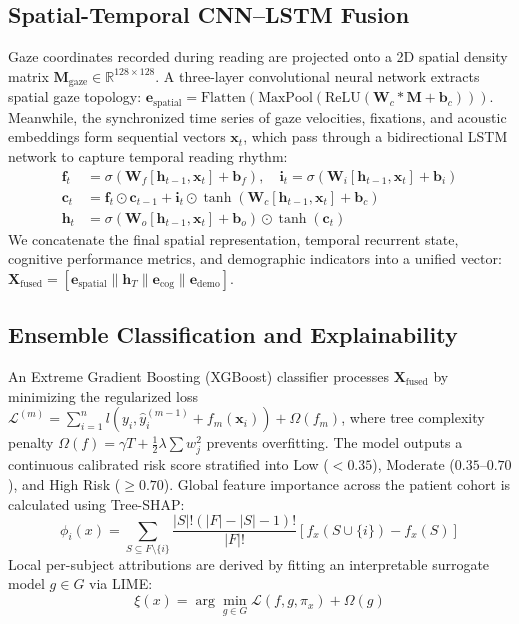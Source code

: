 \documentclass[conference]{IEEEtran}
\begin{document}
\subsection{Spatial-Temporal CNN--LSTM Fusion}
Gaze coordinates recorded during reading are projected onto a 2D spatial density matrix $\mathbf{M}_{\text{gaze}} \in \mathbb{R}^{128 \times 128}$. A three-layer convolutional neural network extracts spatial gaze topology: $\mathbf{e}_{\text{spatial}} = \text{Flatten}(\text{MaxPool}(\text{ReLU}(\mathbf{W}_c * \mathbf{M} + \mathbf{b}_c)))$. Meanwhile, the synchronized time series of gaze velocities, fixations, and acoustic embeddings form sequential vectors $\mathbf{x}_t$, which pass through a bidirectional LSTM network to capture temporal reading rhythm:
\begin{align}
\mathbf{f}_t &= \sigma(\mathbf{W}_f [\mathbf{h}_{t-1}, \mathbf{x}_t] + \mathbf{b}_f), \quad \mathbf{i}_t = \sigma(\mathbf{W}_i [\mathbf{h}_{t-1}, \mathbf{x}_t] + \mathbf{b}_i) \\
\mathbf{c}_t &= \mathbf{f}_t \odot \mathbf{c}_{t-1} + \mathbf{i}_t \odot \tanh(\mathbf{W}_c [\mathbf{h}_{t-1}, \mathbf{x}_t] + \mathbf{b}_c) \\
\mathbf{h}_t &= \sigma(\mathbf{W}_o [\mathbf{h}_{t-1}, \mathbf{x}_t] + \mathbf{b}_o) \odot \tanh(\mathbf{c}_t)
\end{align}
We concatenate the final spatial representation, temporal recurrent state, cognitive performance metrics, and demographic indicators into a unified vector: $\mathbf{X}_{\text{fused}} = [\mathbf{e}_{\text{spatial}} \parallel \mathbf{h}_T \parallel \mathbf{e}_{\text{cog}} \parallel \mathbf{e}_{\text{demo}}]$.

\subsection{Ensemble Classification and Explainability}
An Extreme Gradient Boosting (XGBoost) classifier processes $\mathbf{X}_{\text{fused}}$ by minimizing the regularized loss $\mathcal{L}^{(m)} = \sum_{i=1}^n l(y_i, \hat{y}_i^{(m-1)} + f_m(\mathbf{x}_i)) + \Omega(f_m)$, where tree complexity penalty $\Omega(f) = \gamma T + \frac{1}{2}\lambda \sum w_j^2$ prevents overfitting. The model outputs a continuous calibrated risk score stratified into Low ($<0.35$), Moderate ($0.35$--$0.70$), and High Risk ($\ge 0.70$).
Global feature importance across the patient cohort is calculated using Tree-SHAP:
\begin{equation}
\phi_i(x) = \sum_{S \subseteq F \setminus \{i\}} \frac{|S|!(|F| - |S| - 1)!}{|F|!} [f_x(S \cup \{i\}) - f_x(S)]
\end{equation}
Local per-subject attributions are derived by fitting an interpretable surrogate model $g \in G$ via LIME:
\begin{equation}
\xi(x) = \arg\min_{g \in G} \mathcal{L}(f, g, \pi_x) + \Omega(g)
\end{equation}
\end{document}
